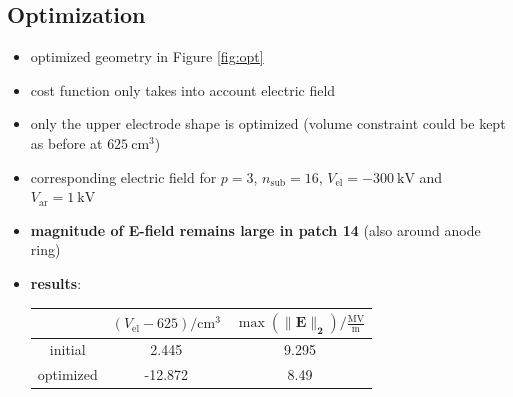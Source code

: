 \subsection{Optimization}
\begin{itemize}
   \item optimized geometry in Figure \ref{fig:opt}
   \item cost function only takes into account electric field
   \item only the upper electrode shape is optimized (volume constraint could be kept as before at $625\ \mathrm{cm}^3$)
   \item corresponding electric field for $p=3$, $n_\mathrm{sub}=16$,  $V_\mathrm{el}=-300\ \mathrm{kV}$ and $V_\mathrm{ar}=1\ \mathrm{kV}$
   \item \textbf{magnitude of E-field remains large in patch 14} (also around anode ring)
   \item \textbf{results}: \qquad
                           \begin{tabular}{c|c|c}
                              & $(V_\mathrm{el}-625) / \mathrm{cm}^3$ & $\max(\mathbf{\|E\|_2}) / \frac{\mathrm{MV}}{\mathrm{m}}$ \\
                              \hline
                              initial & 2.445 & 9.295 \\
                              optimized & -12.872 & 8.49 \\
                            \end{tabular}
\end{itemize}


